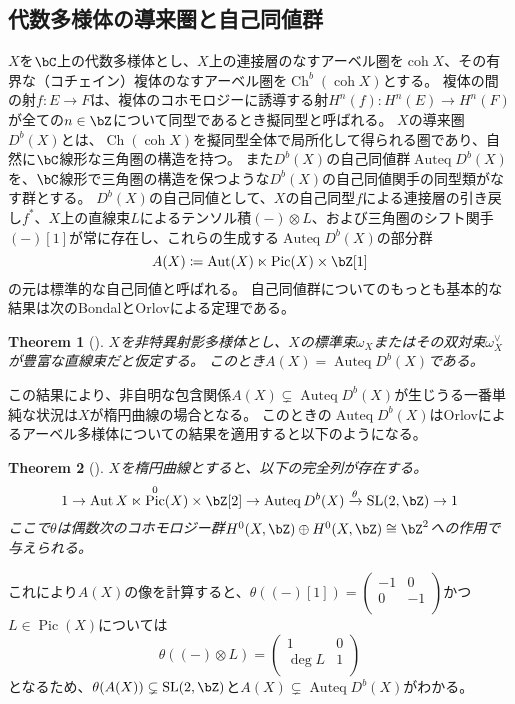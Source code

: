 \documentclass[uplatex,a4paper,dvipdfmx]{jsarticle}
\theoremstyle{plain}
\newtheorem{theorem}{Theorem}[section]
\theoremstyle{definition}
\DeclareMathOperator{\Auteq}{\mathrm{Auteq}}
\DeclareMathOperator{\Pic}{\mathrm{Pic}}
\DeclareMathOperator{\Aut}{\mathrm{Aut}}
\DeclareMathOperator{\SL}{\mathrm{SL}}
\DeclareMathOperator{\Ch}{\mathrm{Ch}}
\DeclareMathOperator{\coh}{\mathrm{coh}}
\begin{document}
\subsection{代数多様体の導来圏と自己同値群}
$X$を$\bC$上の代数多様体とし、$X$上の連接層のなすアーベル圏を$\coh X$、その有界な（コチェイン）複体のなすアーベル圏を$\Ch^b(\coh X)$とする。
複体の間の射$f \colon E \to F$は、複体のコホモロジーに誘導する射$H^n(f) \colon H^n(E) \to H^n(F)$が全ての$n \in \bZ$について同型であるとき擬同型と呼ばれる。
$X$の導来圏$D^b(X)$とは、$\Ch(\coh X)$を擬同型全体で局所化して得られる圏であり、自然に$\bC$線形な三角圏の構造を持つ。
また$D^b(X)$の自己同値群$\Auteq D^b(X)$を、$\bC$線形で三角圏の構造を保つような$D^b(X)$の自己同値関手の同型類がなす群とする。
$D^b(X)$の自己同値として、$X$の自己同型$f$による連接層の引き戻し$f^*$、$X$上の直線束$L$によるテンソル積$(-)\otimes L$、および三角圏のシフト関手$(-)[1]$が常に存在し、これらの生成する$\Auteq D^b(X)$の部分群
\begin{equation}
	A(X) \coloneq \Aut(X) \ltimes \Pic(X) \times \bZ[1]
\end{equation}
の元は標準的な自己同値と呼ばれる。
自己同値群についてのもっとも基本的な結果は次のBondalとOrlovによる定理である。
\begin{theorem}[\cite{MR1818984}]
	$X$を非特異射影多様体とし、$X$の標準束$\omega_X$またはその双対束$\omega_X^\vee$が豊富な直線束だと仮定する。
	このとき$A(X) = \Auteq D^b(X)$である。
\end{theorem}
この結果により、非自明な包含関係$A(X) \subsetneq \Auteq D^b(X)$が生じうる一番単純な状況は$X$が楕円曲線の場合となる。
このときの$\Auteq D^b(X)$はOrlovによるアーベル多様体についての結果を適用すると以下のようになる。
\begin{theorem}[\cite{MR1921811}]
	$X$を楕円曲線とすると、以下の完全列が存在する。
	\begin{equation}\label{eq:autoequivalence_of_elliptic_curve}
		1 \to \Aut{X} \ltimes \Pic^{0}(X)\times \bZ[2] \to \Auteq{D^b(X)} \xrightarrow{\theta} \SL(2, \bZ) \to 1
	\end{equation}
	ここで$\theta$は偶数次のコホモロジー群$H^0(X, \bZ) \oplus H^0(X, \bZ) \cong \bZ^2$への作用で与えられる。
\end{theorem}
これにより$A(X)$の像を計算すると、$\theta((-)[1]) = \begin{pmatrix}
		-1 & 0  \\
		0  & -1 \\
	\end{pmatrix}$かつ$L \in \Pic(X)$については
\begin{equation}
	\theta((-) \otimes L) =
	\begin{pmatrix}
		1      & 0 \\
		\deg L & 1 \\
	\end{pmatrix}
\end{equation}
となるため、$\theta(A(X)) \subsetneq \SL(2, \bZ)$と$A(X) \subsetneq \Auteq D^b(X)$がわかる。
\end{document}

